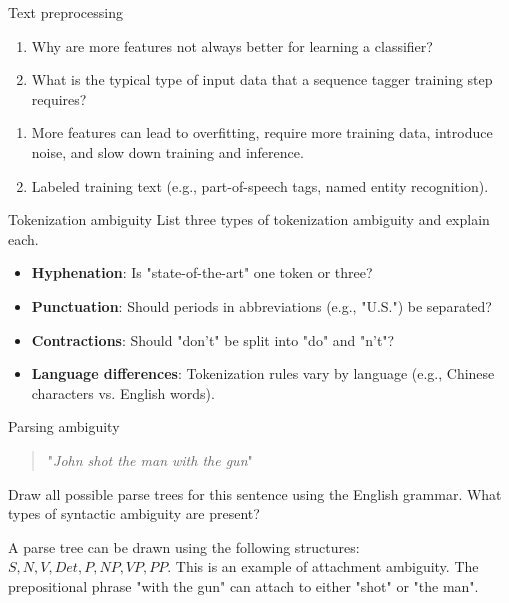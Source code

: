 \documentclass{article}
\begin{document}
\begin{exercise}{Text preprocessing}
  \begin{enumerate}
    \item Why are more features not always better for learning a classifier?
    \item What is the typical type of input data that a sequence tagger training step requires?
  \end{enumerate}

  \begin{solution}
    \begin{enumerate}
      \item More features can lead to overfitting, require more training data, introduce noise, and slow down training and inference.
      \item Labeled training text (e.g., part-of-speech tags, named entity recognition).
    \end{enumerate}
  \end{solution}
\end{exercise}



\setcounter{section}{2022}

\begin{exercise}{Tokenization ambiguity}\label{ex:tokenization}
  List three types of tokenization ambiguity and explain each.

  \begin{solution}
    \begin{itemize}
      \item \textbf{Hyphenation}: Is "state-of-the-art" one token or three?
      \item \textbf{Punctuation}: Should periods in abbreviations (e.g., "U.S.") be separated?
      \item \textbf{Contractions}: Should "don't" be split into "do" and "n't"?
      \item \textbf{Language differences}: Tokenization rules vary by language (e.g., Chinese characters vs. English words).
    \end{itemize}
  \end{solution}
\end{exercise}

\begin{exercise}{Parsing ambiguity}
  \begin{quote}\center "\textit{John shot the man with the gun}"\end{quote}
  Draw all possible parse trees for this sentence using the English grammar. What types of syntactic ambiguity are present?

  \begin{solution}
    A parse tree can be drawn using the following structures: $S, N, V, Det, P, NP, VP, PP$. This is an example of attachment ambiguity. The prepositional phrase "with the gun" can attach to either "shot" or "the man".
  \end{solution}
\end{exercise}
\end{document}
